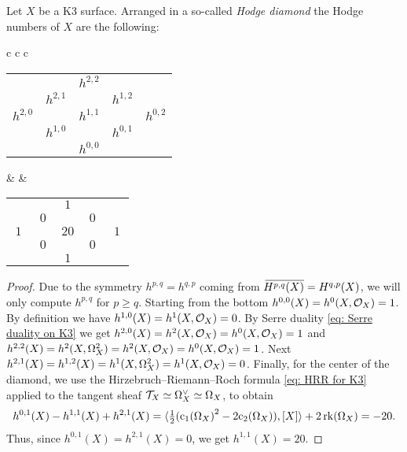 \begin{proposition}
    Let $X$ be a K3 surface. Arranged in a so-called \emph{Hodge diamond} the Hodge numbers of $X$ are the following:
    \begin{center}
        \begin{tabular}{c c c}
            \begin{tabular}{ccccc}
                &  & $h^{2,2}$ &  &  \\
                & $h^{2,1}$ &  & $h^{1,2}$ &  \\
                $h^{2,0}$ &  & $h^{1,1}$ &  & $h^{0,2}$ \\
                & $h^{1,0}$ &  & $h^{0,1}$ &  \\
                &  & $h^{0,0}$ &  &  \\
            \end{tabular} & \qquad &
            \begin{tabular}{ccccc}
                &  & $\ 1 \ $ &  &  \\
                & $\ 0 \ $ &  & $\ 0 \ $ &  \\
                $\ 1 \ $ &  & $20$ &  & $\ 1 \ $ \\
                & $0$ &  & $0$ &  \\
                &  & $1$ &  &  \\
            \end{tabular}
        \end{tabular}
    \end{center}
\end{proposition}

\begin{proof}
    Due to the symmetry $h^{p,q} = h^{q,p}$ coming from $\,\overline{\!{H^{p,q}(X)}} = H^{q,p}(X)$, we will only compute $h^{p,q}$ for $p \geq q$. Starting from the bottom $h^{0,0}(X) = h^0(X, {\mathcal{O}_{X}}) = 1$. By definition we have $h^{1,0}(X) = h^1(X, {\mathcal{O}_{X}}) = 0$. By Serre duality \eqref{eq: Serre duality on K3} we get $h^{2,0}(X) = h^2(X, {\mathcal{O}_{X}}) = h^{0}(X, {\mathcal{O}_{X}}) = 1$ and $h^{2,2}(X) = h^{2}(X, \Omega_X^2) = h^2(X, {\mathcal{O}_{X}}) = h^0(X, {\mathcal{O}_{X}}) = 1$. Next $h^{2,1}(X) = h^{1,2}(X) = h^1(X, \Omega_X^2) = h^1(X, {\mathcal{O}_{X}}) = 0$. Finally, for the center of the diamond, we use the Hirzebruch--Riemann--Roch formula \eqref{eq: HRR for K3} applied to the tangent sheaf $\mathcal{T}_{X} \simeq \Omega_X^\vee \simeq \Omega_X$, to obtain
    \begin{align*}
        h^{0,1}(X) - h^{1,1}(X) + h^{2,1}(X) 
        =\pairing{\tfrac{1}{2}(\cclass[1]{\Omega_X}^2 - 2\cclass[2]{\Omega_X})}{[X]} + 2 \rk{\Omega_X} = -20.
    \end{align*}
    Thus, since $h^{0,1}(X) = h^{2,1}(X) = 0$, we get $h^{1,1}(X) = 20$.
\end{proof}

